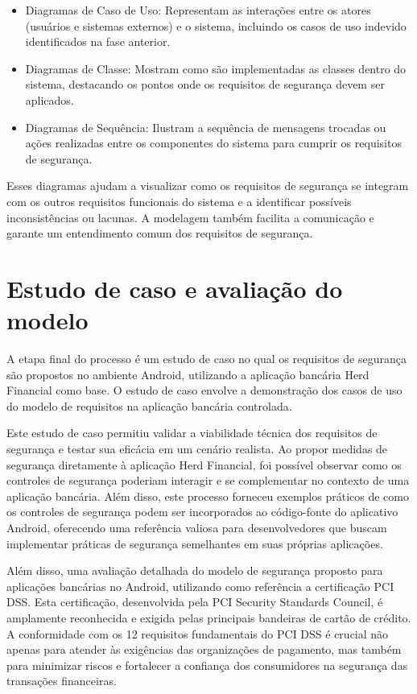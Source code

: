     \begin{itemize}[topsep=3pt, partopsep=3pt, itemsep=3pt, parsep=3pt]
        \item Diagramas de Caso de Uso: Representam as interações entre os atores (usuários e sistemas externos) e o sistema, incluindo os casos de uso indevido identificados na fase anterior.
        \item Diagramas de Classe: Mostram como são implementadas as classes dentro do sistema, destacando os pontos onde os requisitos de segurança devem ser aplicados.
        \item Diagramas de Sequência: Ilustram a sequência de mensagens trocadas ou ações realizadas entre os componentes do sistema para cumprir os requisitos de segurança. 
    \end{itemize}
    
    Esses diagramas ajudam a visualizar como os requisitos de segurança se integram com os outros requisitos funcionais do sistema e a identificar possíveis inconsistências ou lacunas. A modelagem também facilita a comunicação e garante um entendimento comum dos requisitos de segurança.

    \section{Estudo de caso e avaliação do modelo}
    A etapa final do processo é um estudo de caso no qual os requisitos de segurança são propostos no ambiente Android, utilizando a aplicação bancária Herd Financial como base. O estudo de caso envolve a demonstração dos casos de uso do modelo de requisitos na aplicação bancária controlada. 

    Este estudo de caso permitiu validar a viabilidade técnica dos requisitos de segurança e testar sua eficácia em um cenário realista. Ao propor medidas de segurança diretamente à aplicação Herd Financial, foi possível observar como os controles de segurança poderiam interagir e se complementar no contexto de uma aplicação bancária. Além disso, este processo forneceu exemplos práticos de como os controles de segurança podem ser incorporados ao código-fonte do aplicativo Android, oferecendo uma referência valiosa para desenvolvedores que buscam implementar práticas de segurança semelhantes em suas próprias aplicações.

    Além disso, uma avaliação detalhada do modelo de segurança proposto para aplicações bancárias no Android, utilizando como referência a certificação PCI DSS. Esta certificação, desenvolvida pela PCI Security Standards Council, é amplamente reconhecida e exigida pelas principais bandeiras de cartão de crédito. A conformidade com os 12 requisitos fundamentais do PCI DSS é crucial não apenas para atender às exigências das organizações de pagamento, mas também para minimizar riscos e fortalecer a confiança dos consumidores na segurança das transações financeiras.

